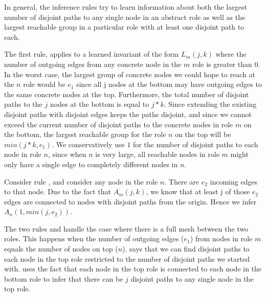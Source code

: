 \documentclass[numbers, 10pt, preprint]{sigplanconf}
\begin{document}
In general, the inference rules try to learn information about both the largest number of disjoint paths to any single node in an abstract role as well as the largest reachable group in a particular role with at least one disjoint path to each.

The first rule,  applies to a learned invariant of the form $L_m(j,k)$ where the number of outgoing edges from any concrete node in the $m$ role is greater than 0. In the worst case, the largest group of concrete nodes we could hope to reach at the $n$ role would be $e_1$ since all j nodes at the bottom may have outgoing edges to the same concrete nodes at the top. Furthermore, the total number of disjoint paths to the $j$ nodes at the bottom is equal to $j*k$. Since extending the existing disjoint paths with disjoint edges keeps the paths disjoint, and since we cannot exceed the current number of disjoint paths to the concrete nodes in role $m$ on the bottom, the largest reachable group for the role $n$ on the top will be $min(j*k,e_1)$. 
%
We conservatively use $1$ for the number of disjoint paths to each node in role $n$, since when $n$ is very large, all reachable nodes in role $m$ might only have a single edge to completely different nodes in $n$.

Consider rule , and consider any node in the role $n$. There are $e_2$ incoming edges to that node. Due to the fact that $A_m(j,k)$, we know that at least j of those $e_2$ edges are connected to nodes with disjoint paths from the origin. Hence we infer $A_n(1,min(j,e_2))$.


The two rules  and  handle the case where there is a full mesh between the two roles. This happens when the number of outgoing edges ($e_1$) from nodes in role $m$ equals the number of nodes on top ($n$).  says that we can find disjoint paths to each node in the top role restricted to the number of disjoint paths we started with.  uses the fact that each node in the top role is connected to each node in the bottom role to infer that there can be $j$ disjoint paths to any single node in the top role.
\end{document}
